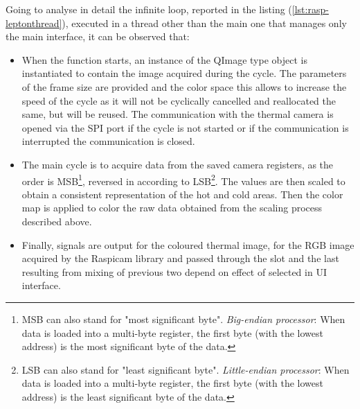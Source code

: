 %
Going to analyse in detail the infinite loop, reported in the
listing (\ref{lst:rasp-leptonthread}), executed in a thread other than the main
one that manages only the main interface, it can be observed that:
\begin{itemize}
\item When the function starts, an instance of the QImage type object is
instantiated to contain the image acquired during the cycle. The parameters of the
frame size are provided and the color space this allows to increase the speed of
the cycle as it will not be cyclically cancelled and reallocated the same, but
will be reused. The communication with the thermal camera is opened via the SPI
port if the cycle is not started or if the communication is interrupted the
communication is closed.
%
\item The main cycle is to acquire data from the saved camera registers, as the
order is MSB\footnote{MSB can also stand for "most significant byte".
\emph{Big-endian processor}: When data is loaded into a multi-byte register, the
first byte (with the lowest address) is the most significant byte of the
data.\cite{56322}}, reversed in according to LSB\footnote{LSB can also stand
for "least significant byte". \emph{Little-endian processor}: When data is
loaded into a multi-byte register, the first byte (with the lowest address) is
the least significant byte of the data.\cite{56322}}. The values are then scaled
to obtain a consistent representation of the hot and cold areas. Then the color
map is applied to color the raw data obtained from the scaling process described
above.
\item Finally, signals are output for the coloured thermal image, for the RGB
image acquired by the Raspicam library and passed through the slot and the last
resulting from mixing of previous two depend on effect of selected in UI interface.
\end{itemize}
